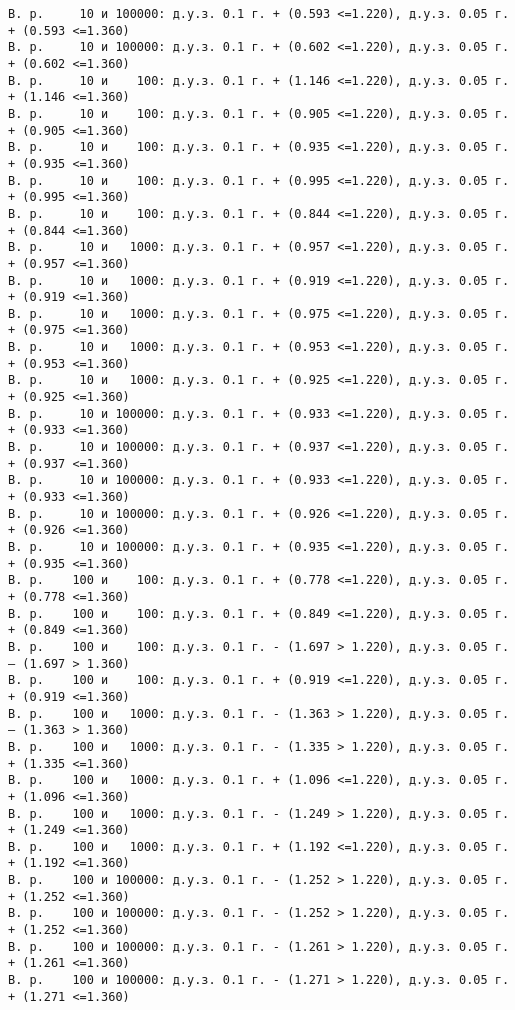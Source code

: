 \documentclass[11pt]{article}
\begin{document}
{\begin{Verbatim}[commandchars=\\\{\}]
В. р.     10 и 100000: д.у.з. 0.1 г. + (0.593 <=1.220), д.у.з. 0.05 г. + (0.593 <=1.360)
В. р.     10 и 100000: д.у.з. 0.1 г. + (0.602 <=1.220), д.у.з. 0.05 г. + (0.602 <=1.360)
В. р.     10 и    100: д.у.з. 0.1 г. + (1.146 <=1.220), д.у.з. 0.05 г. + (1.146 <=1.360)
В. р.     10 и    100: д.у.з. 0.1 г. + (0.905 <=1.220), д.у.з. 0.05 г. + (0.905 <=1.360)
В. р.     10 и    100: д.у.з. 0.1 г. + (0.935 <=1.220), д.у.з. 0.05 г. + (0.935 <=1.360)
В. р.     10 и    100: д.у.з. 0.1 г. + (0.995 <=1.220), д.у.з. 0.05 г. + (0.995 <=1.360)
В. р.     10 и    100: д.у.з. 0.1 г. + (0.844 <=1.220), д.у.з. 0.05 г. + (0.844 <=1.360)
В. р.     10 и   1000: д.у.з. 0.1 г. + (0.957 <=1.220), д.у.з. 0.05 г. + (0.957 <=1.360)
В. р.     10 и   1000: д.у.з. 0.1 г. + (0.919 <=1.220), д.у.з. 0.05 г. + (0.919 <=1.360)
В. р.     10 и   1000: д.у.з. 0.1 г. + (0.975 <=1.220), д.у.з. 0.05 г. + (0.975 <=1.360)
В. р.     10 и   1000: д.у.з. 0.1 г. + (0.953 <=1.220), д.у.з. 0.05 г. + (0.953 <=1.360)
В. р.     10 и   1000: д.у.з. 0.1 г. + (0.925 <=1.220), д.у.з. 0.05 г. + (0.925 <=1.360)
В. р.     10 и 100000: д.у.з. 0.1 г. + (0.933 <=1.220), д.у.з. 0.05 г. + (0.933 <=1.360)
В. р.     10 и 100000: д.у.з. 0.1 г. + (0.937 <=1.220), д.у.з. 0.05 г. + (0.937 <=1.360)
В. р.     10 и 100000: д.у.з. 0.1 г. + (0.933 <=1.220), д.у.з. 0.05 г. + (0.933 <=1.360)
В. р.     10 и 100000: д.у.з. 0.1 г. + (0.926 <=1.220), д.у.з. 0.05 г. + (0.926 <=1.360)
В. р.     10 и 100000: д.у.з. 0.1 г. + (0.935 <=1.220), д.у.з. 0.05 г. + (0.935 <=1.360)
В. р.    100 и    100: д.у.з. 0.1 г. + (0.778 <=1.220), д.у.з. 0.05 г. + (0.778 <=1.360)
В. р.    100 и    100: д.у.з. 0.1 г. + (0.849 <=1.220), д.у.з. 0.05 г. + (0.849 <=1.360)
В. р.    100 и    100: д.у.з. 0.1 г. - (1.697 > 1.220), д.у.з. 0.05 г. – (1.697 > 1.360)
В. р.    100 и    100: д.у.з. 0.1 г. + (0.919 <=1.220), д.у.з. 0.05 г. + (0.919 <=1.360)
В. р.    100 и   1000: д.у.з. 0.1 г. - (1.363 > 1.220), д.у.з. 0.05 г. – (1.363 > 1.360)
В. р.    100 и   1000: д.у.з. 0.1 г. - (1.335 > 1.220), д.у.з. 0.05 г. + (1.335 <=1.360)
В. р.    100 и   1000: д.у.з. 0.1 г. + (1.096 <=1.220), д.у.з. 0.05 г. + (1.096 <=1.360)
В. р.    100 и   1000: д.у.з. 0.1 г. - (1.249 > 1.220), д.у.з. 0.05 г. + (1.249 <=1.360)
В. р.    100 и   1000: д.у.з. 0.1 г. + (1.192 <=1.220), д.у.з. 0.05 г. + (1.192 <=1.360)
В. р.    100 и 100000: д.у.з. 0.1 г. - (1.252 > 1.220), д.у.з. 0.05 г. + (1.252 <=1.360)
В. р.    100 и 100000: д.у.з. 0.1 г. - (1.252 > 1.220), д.у.з. 0.05 г. + (1.252 <=1.360)
В. р.    100 и 100000: д.у.з. 0.1 г. - (1.261 > 1.220), д.у.з. 0.05 г. + (1.261 <=1.360)
В. р.    100 и 100000: д.у.з. 0.1 г. - (1.271 > 1.220), д.у.з. 0.05 г. + (1.271 <=1.360)

\end{Verbatim}}
\end{document}
